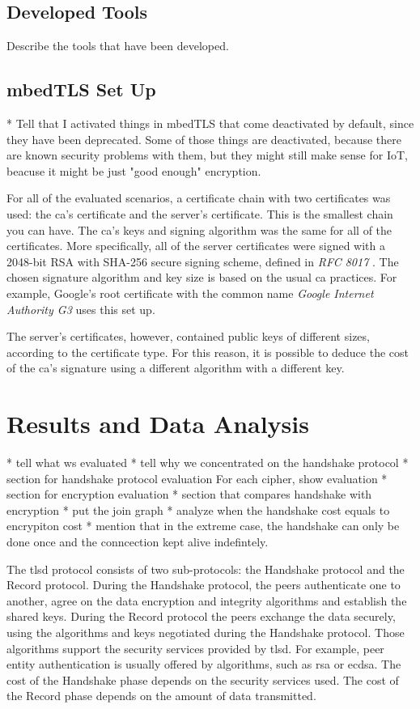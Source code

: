 \documentclass{llncs}
\begin{document}
\subsection{Developed Tools}

Describe the tools that have been developed.

\subsection{mbedTLS Set Up}

* Tell that I activated things in mbedTLS that come deactivated by default, since they have been deprecated.
Some of those things are deactivated, because there are known security problems with them, but they might
still make sense for IoT, beacuse it might be just "good enough" encryption.

For all of the evaluated scenarios, a certificate chain with two certificates was used: the \gls{ca}'s certificate
and the server's certificate. This is the smallest chain you can have. The \gls{ca}'s keys and signing algorithm was
the same for all of the certificates. More specifically, all of the server certificates were signed with a
2048-bit RSA with SHA-256 secure signing scheme, defined in \textit{RFC 8017} \cite{RFC8017}. The chosen
signature algorithm and key size is based on the usual \gls{ca} practices. For example, Google's root certificate
with the common name \textit{Google Internet Authority G3} uses this set up.

The server's certificates, however, contained public keys of different sizes, according to the certificate type.
For this reason, it is possible to deduce the cost of the \gls{ca}'s signature using a different algorithm with a
different key.

\section{Results and Data Analysis}

* tell what ws evaluated
* tell why we concentrated on the handshake protocol
* section for handshake protocol evaluation
  For each cipher, show evaluation
* section for encryption evaluation
* section that compares handshake with encryption
  * put the join graph
  * analyze when the handshake cost equals to encrypiton cost 
  * mention that in the extreme case, the handshake can only be done once and
    the conncection kept alive indefintely.
  
The \gls{tlsd} protocol consists of two sub-protocols: the Handshake protocol and the Record protocol.
During the Handshake protocol, the peers authenticate one to another, agree on the data encryption and integrity 
algorithms and establish the shared keys. During the Record protocol the peers exchange the data securely, 
using the algorithms and keys negotiated during the Handshake protocol. Those algorithms support the security
services provided by \gls{tlsd}. For example, peer entity authentication is usually offered by algorithms, such
as \gls{rsa} or \gls{ecdsa}. The cost of the Handshake phase depends on the security services used. The cost
of the Record phase depends on the amount of data transmitted.
\end{document}
